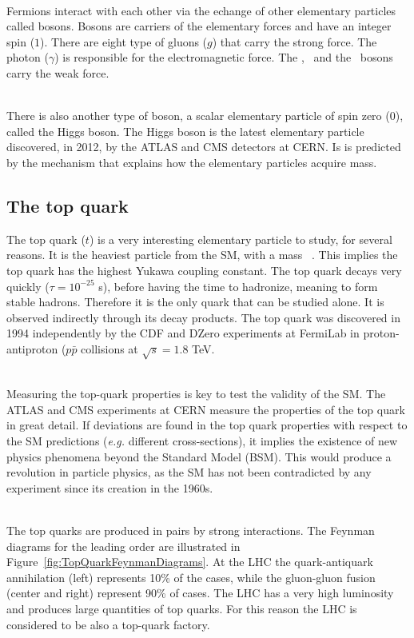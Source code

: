 \ \\Fermions interact with each other via the echange of other elementary particles called bosons. Bosons are carriers of the elementary forces and have an integer spin ($1$). There are eight type of gluons ($g$) that carry the strong force. The photon ($\gamma$) is responsible for the electromagnetic force. The \Wplus, \Wminus~and the \Zzero~bosons carry the weak force. 

\ \\There is also another type of boson, a scalar elementary particle of spin zero (0), called the Higgs boson. The Higgs boson is the latest elementary particle discovered, in 2012, by the ATLAS and CMS detectors at CERN. Is is predicted by the mechanism that explains how the elementary particles acquire mass.

\subsection{The top quark}
\label{sec:TopQuark}

The top quark ($t$) is a very interesting elementary particle to study, for several reasons. It is the heaviest particle from the SM, with a mass ~\GeVcc. This implies the top quark has the highest Yukawa coupling constant. The top quark decays very quickly ($\tau=10^{-25}$ s), before having the time to hadronize, meaning to form stable hadrons. Therefore it is the only quark that can be studied alone. It is observed indirectly through its decay products. The top quark was discovered in 1994 independently by the CDF and DZero experiments at FermiLab in proton-antiproton ($p\bar{p}$ collisions at $\sqrt{s}=1.8$ TeV.

\ \\Measuring the top-quark properties is key to test the validity of the SM. The ATLAS and CMS experiments at CERN measure the properties of the top quark in great detail. If deviations are found in the top quark properties with respect to the SM predictions (\emph{e.g.} different cross-sections), it implies the existence of new physics phenomena beyond the Standard Model (BSM). This would produce a revolution in particle physics, as the SM has not been contradicted by any experiment since its creation in the 1960s. 

\ \\The top quarks are produced in pairs by strong interactions. The Feynman diagrams for the leading order are illustrated in Figure~\ref{fig:TopQuarkFeynmanDiagrams}. At the LHC the quark-antiquark annihilation (left) represents 10\% of the cases, while the gluon-gluon fusion (center and right) represent 90\% of cases. The LHC has a very high luminosity and produces large quantities of top quarks. For this reason the LHC is considered to be also a top-quark factory.

